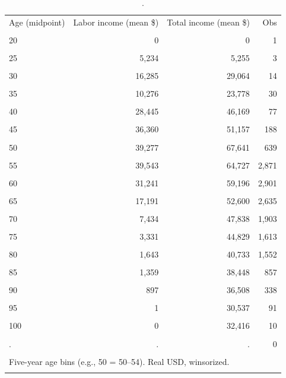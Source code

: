 \begin{table}[htbp]\centering
\caption{.}
\label{tab:income_mean_by_agegroup_2020}
\begin{tabular}{lrrr}\toprule
Age (midpoint) & Labor income (mean \$) & Total income (mean \$) & Obs \\\\ \midrule
20 & 0 & 0 & 1 \\\\
25 & 5,234 & 5,255 & 3 \\\\
30 & 16,285 & 29,064 & 14 \\\\
35 & 10,276 & 23,778 & 30 \\\\
40 & 28,445 & 46,169 & 77 \\\\
45 & 36,360 & 51,157 & 188 \\\\
50 & 39,277 & 67,641 & 639 \\\\
55 & 39,543 & 64,727 & 2,871 \\\\
60 & 31,241 & 59,196 & 2,901 \\\\
65 & 17,191 & 52,600 & 2,635 \\\\
70 & 7,434 & 47,838 & 1,903 \\\\
75 & 3,331 & 44,829 & 1,613 \\\\
80 & 1,643 & 40,733 & 1,552 \\\\
85 & 1,359 & 38,448 & 857 \\\\
90 & 897 & 36,508 & 338 \\\\
95 & 1 & 30,537 & 91 \\\\
100 & 0 & 32,416 & 10 \\\\
. & . & . & 0 \\\\
\bottomrule
\multicolumn{4}{l}{\footnotesize Five-year age bins (e.g., 50 = 50--54). Real USD, winsorized.} \\\\
\end{tabular}
\end{table}
